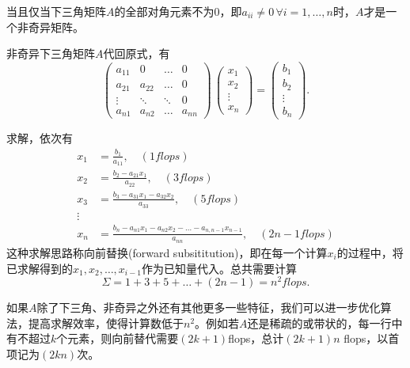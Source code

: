 \begin{subappendices}
当且仅当下三角矩阵$A$的全部对角元素不为$0$，即$a_{ii} \neq 0 \, \forall i =1,\ldots,n$时，$A$才是一个非奇异矩阵。

非奇异下三角矩阵$A$代回原式，有
\begin{equation*}
  \begin{pmatrix}
  a_{11} & 0 & \ldots & 0 \\
  a_{21} & a_{22} &\ldots & 0 \\
  \vdots & \ddots & \ddots & 0\\
  a_{n1} & a_{n2} & \ldots & a_{nn}
\end{pmatrix}
\,
\begin{pmatrix}
  x_{1} \\ x_{2} \\ \vdots \\ x_{n}
\end{pmatrix}
=
\begin{pmatrix}
  b_{1} \\
  b_{2} \\
  \vdots \\
  b_{n}
\end{pmatrix}.
\end{equation*}

求解，依次有
\begin{equation*}
  \begin{split}
    x_{1} & = \frac{b_{1}}{a_{11}}, \quad (1 flops)\\
    x_{2} & = \frac{b_{2} - a_{21} x_{1}}{a_{22}}, \quad (3 flops)\\
    x_{3} & = \frac{b_{3} - a_{31} x_{1} - a_{32} x_{2}}{a_{33}}, \quad (5 flops)\\
    \vdots & \\
    x_{n} & = \frac{
    b_{n} - a_{n1} x_{1} - a_{n2} x_{2} - \ldots - a_{n,n-1} x_{n-1}
    }{
    a_{nn}
    }, \quad (2n-1 flops)
  \end{split}
\end{equation*}
这种求解思路称向前替换(forward subsititution)，即在每一个计算$x_{i}$的过程中，将已求解得到的$x_{1},x_{2},\ldots,x_{i-1}$作为已知量代入。总共需要计算
\begin{equation*}
  \Sigma = 1 + 3 + 5 + \ldots + \left( 2 n - 1 \right)
  = n^{2} flops.
\end{equation*}

如果$A$除了下三角、非奇异之外还有其他更多一些特征，我们可以进一步优化算法，提高求解效率，使得计算数低于$n^{2}$。例如若$A$还是稀疏的或带状的，每一行中有不超过$k$个元素，则向前替代需要$\left( 2k+1 \right)$flops，总计$\left( 2k + 1 \right) n$ flops，以首项记为$\left( 2kn \right)$次。



\end{subappendices}
